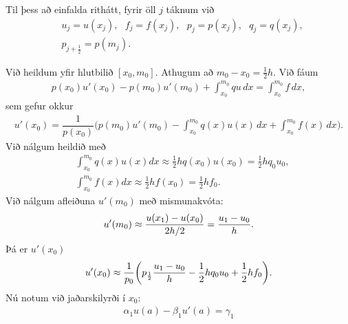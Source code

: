 \documentclass[a4paper,10pt,icelandic]{sphinxmanual}
\begin{document}
Til þess að einfalda rithátt, fyrir öll \(j\) táknum við
\begin{equation*}
\begin{split}& u_j=u(x_j), ~~~ f_j=f(x_j), ~~~ p_j=p(x_j),~~~ q_j=q(x_j), \\
& p_{j+\frac 12}=p(m_j).\end{split}
\end{equation*}

Við heildum yfir hlutbilið \([x_0, m_0]\).
Athugum að \(m_0-x_0=\frac 12 h\).
Við fáum
\begin{equation*}
\begin{split}p(x_0)u'(x_0)-p(m_0)u'(m_0)
+\int_{x_0}^{m_0} qu\, dx=\int_{x_0}^{m_0} f\, dx,\end{split}
\end{equation*}
sem gefur okkur
\begin{equation*}
\begin{split}u'(x_0)=\dfrac 1{p(x_0)}\bigg(p(m_0)u'(m_0)
-\int_{x_0}^{m_0}q(x)u(x)\, dx
+\int_{x_0}^{m_0}f(x)\, dx\bigg).\end{split}
\end{equation*}
Við nálgum heildið með
\begin{equation*}
\begin{split}&\int_{x_0}^{m_0}q(x)u(x) dx\approx \frac 12 h q(x_0) u(x_0) = \frac 12 h q_0 u_0, \\
& \int_{x_0}^{m_0}f(x) dx\approx \frac 12 h f(x_0)= \frac 12 h f_0.\end{split}
\end{equation*}
Við nálgum afleiðuna \(u'(m_0)\) með mismunakvóta:
\begin{equation*}
\begin{split}u'(m_0)\approx {u(x_1)-u(x_0)\over 2 h/2}=  {u_1-u_0\over h}.\end{split}
\end{equation*}
Þá er \(u'(x_0)\)
\begin{equation*}
\begin{split}u'(x_0)\approx\dfrac 1{p_0}\bigg(p_{\frac 12} {u_1-u_0\over h}
-\frac 12 h q_0 u_0
+\frac 12 h f_0\bigg).\end{split}
\end{equation*}
Nú notum við jaðarskilyrði í \(x_0\):
\begin{equation*}
\begin{split}\alpha_1u(a)-\beta_1u'(a)=\gamma_1\end{split}
\end{equation*}
\end{document}
